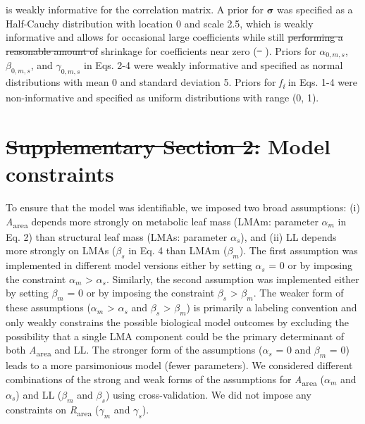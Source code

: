 \documentclass[
  12pt,
  letterpaper,
  DIV=11,
  numbers=noendperiod]{scrartcl}
\numberwithin{equation}{section} %
\providecommand{\DIFadd}[1]{{\protect\color{blue}\uwave{#1}}} %
\providecommand{\DIFdel}[1]{{\protect\color{red}\sout{#1}}}                      %
\providecommand{\DIFaddbegin}{} %
\providecommand{\DIFaddend}{} %
\providecommand{\DIFdelbegin}{} %
\providecommand{\DIFdelend}{} %
\newcommand{\DIFscaledelfig}{0.5}
\newlength{\DIFdelgraphicswidth} %
\newlength{\DIFdelgraphicsheight} %
\newcommand{\DIFaddincludegraphics}[2][]{{\color{blue}\fbox{\DIFOincludegraphics[#1]{#2}}}} %
\newcommand{\DIFdelincludegraphics}[2][]{%
\sbox{\DIFdelgraphicsbox}{\DIFOincludegraphics[#1]{#2}}%
\settoboxwidth{\DIFdelgraphicswidth}{\DIFdelgraphicsbox} %
\settoboxtotalheight{\DIFdelgraphicsheight}{\DIFdelgraphicsbox} %
\scalebox{\DIFscaledelfig}{%
\parbox[b]{\DIFdelgraphicswidth}{\usebox{\DIFdelgraphicsbox}\\[-\baselineskip] \rule{\DIFdelgraphicswidth}{0em}}\llap{\resizebox{\DIFdelgraphicswidth}{\DIFdelgraphicsheight}{%
\setlength{\unitlength}{\DIFdelgraphicswidth}%
\begin{picture}(1,1)%
\thicklines\linethickness{2pt} %
{\color[rgb]{1,0,0}\put(0,0){\framebox(1,1){}}}%
{\color[rgb]{1,0,0}\put(0,0){\line( 1,1){1}}}%
{\color[rgb]{1,0,0}\put(0,1){\line(1,-1){1}}}%
\end{picture}%
}\hspace*{3pt}}} %
} %
\DeclareRobustCommand{\DIFaddbegin}{\DIFOaddbegin \let\includegraphics\DIFaddincludegraphics} %
\DeclareRobustCommand{\DIFaddend}{\DIFOaddend \let\includegraphics\DIFOincludegraphics} %
\DeclareRobustCommand{\DIFdelbegin}{\DIFOdelbegin \let\includegraphics\DIFdelincludegraphics} %
\DeclareRobustCommand{\DIFdelend}{\DIFOaddend \let\includegraphics\DIFOincludegraphics} %
\begin{document}
is weakly informative for the correlation matrix. A prior for
\(\boldsymbol{\sigma}\) was specified as a Half-Cauchy distribution with
location 0 and scale 2.5, which is weakly informative and allows for
occasional large coefficients while still \DIFdelbegin \DIFdel{performing a reasonable amount
of }\DIFdelend \DIFaddbegin \DIFadd{providing reasonable }\DIFaddend shrinkage
for coefficients near zero (\DIFdelbegin \DIFdel{\mbox{%
\citeproc{ref-Gelman2008}{Gelman et al., 2008}}\hspace{0pt}%
}\DIFdelend \DIFaddbegin \DIFadd{\mbox{%
\citeproc{ref-Gelman2008}{Gelman A et al.
2008}}\hspace{0pt}%
}\DIFaddend ). Priors for \(\alpha_{0,m,s}\), \(\beta_{0,m,s}\), and
\(\gamma_{0,m,s}\) in Eqs. 2-4 were weakly informative and specified as
normal distributions with mean 0 and standard deviation 5. Priors for
\emph{f\textsubscript{i}} in Eqs. 1-4 were non-informative and specified
as uniform distributions with range (0, 1).

\newpage

\section{\DIFdelbegin \DIFdel{Supplementary Section 2: }\DIFdelend Model constraints}\DIFdelbegin %
\DIFdelend \DIFaddbegin \label{model-constraints}
\DIFaddend 

To ensure that the model was identifiable, we imposed two broad
assumptions: (i) \emph{A}\textsubscript{area} depends more strongly on
metabolic leaf mass (LMAm: parameter \(\alpha_m\) in Eq. 2) than \DIFaddbegin \DIFadd{on
}\DIFaddend structural leaf mass (LMAs: parameter \(\alpha_s\)), and (ii) LL depends
more strongly on LMAs (\(\beta_s\) in Eq. 4 than \DIFaddbegin \DIFadd{on }\DIFaddend LMAm (\(\beta_m\)).
The first assumption was implemented in different model versions either
by setting \(\alpha_s\) = 0 or by imposing the constraint \(\alpha_m\)
\textgreater{} \(\alpha_s\). Similarly, the second assumption was
implemented either by setting \(\beta_m\) = 0 or by imposing the
constraint \(\beta_s\) \textgreater{} \(\beta_m\). The weaker form of
these assumptions (\(\alpha_m\) \textgreater{} \(\alpha_s\) and
\(\beta_s\) \textgreater{} \(\beta_m\)) is primarily a labeling
convention and only weakly constrains the possible biological model
outcomes by excluding the possibility that a single LMA component could
be the primary determinant of both \emph{A}\textsubscript{area} and LL.
The stronger form of the assumptions (\(\alpha_s\) = 0 and \(\beta_m\) =
0) leads to a more parsimonious model (fewer parameters). We considered
different combinations of the strong and weak forms of the assumptions
for \emph{A}\textsubscript{area} (\(\alpha_m\) and \(\alpha_s\)) and LL
(\(\beta_m\) and \(\beta_s\)) using cross-validation. We did not impose
any constraints on \emph{R}\textsubscript{area} (\(\gamma_m\) and
\(\gamma_s\)).
\end{document}
